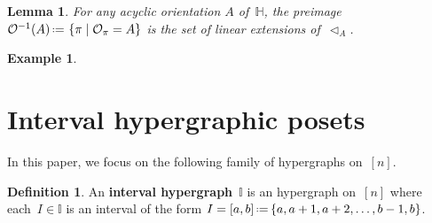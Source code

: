 \documentclass[reqno]{amsart}
\newtheorem{lemma}[theorem]{Lemma}
\theoremstyle{definition}
\newtheorem{definition}[theorem]{Definition}
\newtheorem{example}[theorem]{Example}
\newcommand{\set}[2]{\left\{ #1 \;\middle|\; #2 \right\}} %
\newcommand{\eqdef}{\mbox{\,\raisebox{0.2ex}{\scriptsize\ensuremath{\mathrm:}}\ensuremath{=}\,}} %
\newcommand{\defn}[1]{\textbf{\textsf{\color{PineGreen} #1}}} %
\newcommand{\vincent}[1]{\todo[color=blue!30]{#1 \\ \hfill --- V.}}
\newcommand{\less}{\vartriangleleft} %
\newcommand{\Or}{\mathcal O}  %
\newcommand{\HH}{\mathbb H}  %
\newcommand{\II}{\mathbb I} %
\begin{document}
\begin{lemma}
\label{lem:prepi}
For any acyclic orientation $A$ of~$\HH$, the preimage $\Or^{-1}(A) \eqdef \set{\pi}{\Or_\pi=A}$ is the set of linear extensions of~$\less_A$.
\end{lemma}

\begin{example}
\vincent{todo}
\end{example}




\section{Interval hypergraphic posets}
\label{sec:IHP}

In this paper, we focus on the following family of hypergraphs on~$[n]$.

\begin{definition}
An \defn{interval hypergraph}~$\II$ is an hypergraph on~$[n]$ where each~$I \in \II$ is an interval of the form $I = [a,b] \eqdef \{a, a+1, a+2, \dots, b-1, b\}$.
\end{definition}
\end{document}
